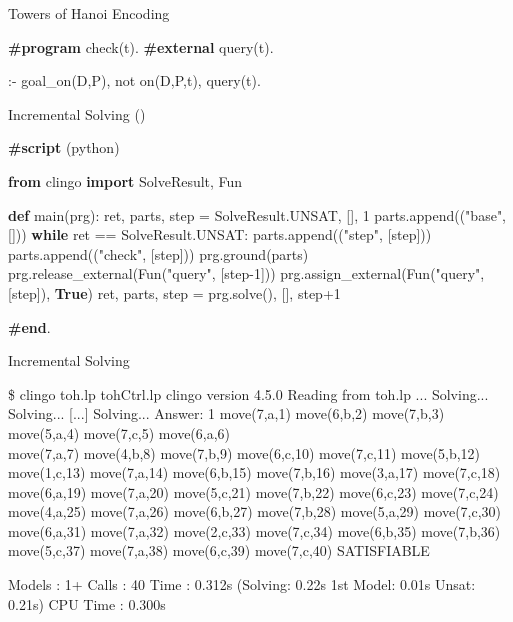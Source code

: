 \begin{frame}[fragile]{Towers of Hanoi Encoding}
\begin{semiverbatim}
{\bf\#program} check(t).
{\bf\#external} query(t).

:- goal_on(D,P), not on(D,P,t), query(t).
\end{semiverbatim}
\end{frame}
\begin{frame}[fragile]{Incremental Solving ()}
\small
  \begin{semiverbatim}
{\bf{}#script} (python)

{\bf{}from} clingo {\bf{}import} SolveResult, Fun

{\bf{}def} main(prg):
    ret, parts, step = SolveResult.UNSAT, [], 1
    parts.append(("base", []))
    {\bf{}while} ret == SolveResult.UNSAT:
        parts.append(("step", [step]))
        parts.append(("check", [step]))
        prg.ground(parts)
        prg.release_external(Fun("query", [step-1]))
        prg.assign_external(Fun("query", [step]), {\bf{}True})
        ret, parts, step = prg.solve(), [], step+1

{\bf{}#end}.
  \end{semiverbatim}
\end{frame}
\begin{frame}[fragile]{Incremental Solving}
\scriptsize
\begin{semiverbatim}
\$ clingo toh.lp tohCtrl.lp \pause
clingo version 4.5.0
Reading from toh.lp ...
Solving...
Solving...
[...]
Solving...
Answer: 1
move(7,a,1)  move(6,b,2)  move(7,b,3)  move(5,a,4)  move(7,c,5)  move(6,a,6)  \\
move(7,a,7)  move(4,b,8)  move(7,b,9)  move(6,c,10) move(7,c,11) move(5,b,12) \\
move(1,c,13) move(7,a,14) move(6,b,15) move(7,b,16) move(3,a,17) move(7,c,18) \\
move(6,a,19) move(7,a,20) move(5,c,21) move(7,b,22) move(6,c,23) move(7,c,24) \\
move(4,a,25) move(7,a,26) move(6,b,27) move(7,b,28) move(5,a,29) move(7,c,30) \\
move(6,a,31) move(7,a,32) move(2,c,33) move(7,c,34) move(6,b,35) move(7,b,36) \\
move(5,c,37) move(7,a,38) move(6,c,39) move(7,c,40)
SATISFIABLE

Models       : 1+
Calls        : 40
Time         : 0.312s (Solving: 0.22s 1st Model: 0.01s Unsat: 0.21s)
CPU Time     : 0.300s
\end{semiverbatim}
\end{frame}
